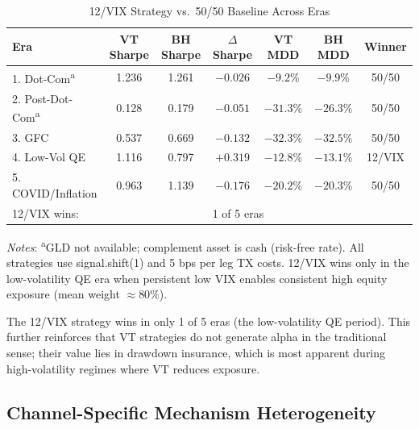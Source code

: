 \documentclass[12pt,a4paper]{article}
\begin{document}
\begin{table}[H]
\centering
\small
\begin{threeparttable}
\caption{12/VIX Strategy vs.\ 50/50 Baseline Across Eras}
\label{tab:strategy_eras}
\begin{tabular}{@{}lcccccc@{}}
\toprule
Era & VT Sharpe & BH Sharpe & $\Delta$Sharpe & VT MDD & BH MDD & Winner \\
\midrule
1. Dot-Com\textsuperscript{a} & 1.236 & 1.261 & $-0.026$ & $-9.2\%$ & $-9.9\%$ & 50/50 \\
2. Post-Dot-Com\textsuperscript{a} & 0.128 & 0.179 & $-0.051$ & $-31.3\%$ & $-26.3\%$ & 50/50 \\
3. GFC & 0.537 & 0.669 & $-0.132$ & $-32.3\%$ & $-32.5\%$ & 50/50 \\
4. Low-Vol QE & 1.116 & 0.797 & $+0.319$ & $-12.8\%$ & $-13.1\%$ & 12/VIX \\
5. COVID/Inflation & 0.963 & 1.139 & $-0.176$ & $-20.2\%$ & $-20.3\%$ & 50/50 \\
\midrule
\multicolumn{3}{l}{12/VIX wins:} & \multicolumn{4}{l}{1 of 5 eras} \\
\bottomrule
\end{tabular}
\begin{tablenotes}
\small
\item \textit{Notes}: \textsuperscript{a}GLD not available; complement asset is cash (risk-free rate). All strategies use signal.shift(1) and 5 bps per leg TX costs. 12/VIX wins only in the low-volatility QE era when persistent low VIX enables consistent high equity exposure (mean weight $\approx 80\%$).
\end{tablenotes}
\end{threeparttable}
\end{table}

The 12/VIX strategy wins in only 1 of 5 eras (the low-volatility QE period). This further reinforces that VT strategies do not generate alpha in the traditional sense; their value lies in drawdown insurance, which is most apparent during high-volatility regimes where VT reduces exposure.

\subsection{Channel-Specific Mechanism Heterogeneity}
\label{subsec:channel_specific}

\end{document}
